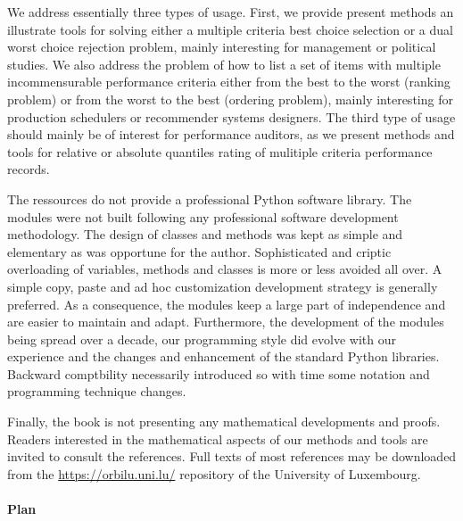 We address essentially three types of usage. First, we provide present methods an illustrate tools for solving either a multiple criteria best choice selection or a dual worst choice rejection problem, mainly interesting for management or political studies. We also address the problem of how to list a set of items with multiple incommensurable performance criteria either from the best to the worst (ranking problem) or from the worst to the best (ordering problem), mainly interesting for production schedulers or recommender systems designers. The third type of usage should mainly be of interest for performance auditors, as we present methods and tools for relative or absolute quantiles rating of mulitiple criteria performance records. 

The \Digraph ressources do not provide a professional Python software library. The modules were not built following any professional software development methodology. The design of classes and methods was kept as simple and elementary as was opportune for the author. Sophisticated and criptic overloading of variables, methods and classes is more or less avoided all over. A simple copy, paste and ad hoc customization development strategy is generally preferred. As a consequence, the modules keep a large part of independence and are easier to maintain and adapt.  Furthermore, the development of the \Digraph modules being spread over a decade, our programming style did evolve with our experience and the changes and enhancement of the standard Python libraries. Backward comptbility necessarily introduced so with time some notation and programming technique changes.

Finally, the book is not presenting any mathematical developments and proofs. Readers interested in the mathematical aspects of our methods and tools are invited to consult the references. Full texts of most references may be downloaded from the \href{https://orbilu.uni.lu/}{https://orbilu.uni.lu/} repository of the University of Luxembourg. 

\paragraph{Plan}

